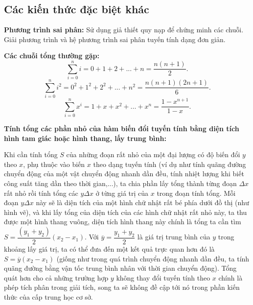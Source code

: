 \documentclass{article}
\begin{document}
\begin{multicols}{2}
\subsection{Các kiến thức đặc biệt khác}

\noindent \textbf{Phương trình sai phân:} Sử dụng giả thiết quy nạp để chứng minh các chuỗi. Giải phương trình và hệ phương trình sai phân tuyến tính dạng đơn giản.

\noindent \textbf{Các chuỗi tổng thường gặp:}
$$\sum_{i=0}^n i = 0+1+2+...+n = \dfrac{n(n+1)}{2}.$$
$$\sum_{i=0}^n i^2 = 0^2+1^2+2^2+...+n^2 = \dfrac{n(n+1)(2n+1)}{6}.$$
$$\sum_{i=0}^n x^i = 1+x+x^2+...+x^n = \dfrac{1-x^{n+1}}{1-x}.$$

\noindent \textbf{Tính tổng các phần nhỏ của hàm biến đổi tuyến tính bằng diện tích hình tam giác hoặc hình thang, lấy trung bình:}

Khi cần tính tổng $S$ của những đoạn rất nhỏ của một đại lượng có độ biến đổi $y$ theo $x$, phụ thuộc vào biến $x$ theo dạng tuyến tính (ví dụ như tính quãng đường chuyển động của một vật chuyển động nhanh dần đều, tính nhiệt lượng khi biết công suất tăng dần theo thời gian,...), ta chia phần lấy tổng thành từng đoạn $\Delta x$ rất nhỏ rồi tính tổng các $y \Delta x$ ở từng giá trị của $x$ trong đoạn tính tổng. Mỗi đoạn $y \Delta x$ này sẽ là diện tích của một hình chữ nhật rất bé phía dưới đồ thị (như hình vẽ), và khi lấy tổng của diện tích của các hình chữ nhật rất nhỏ này, ta thu được một hình thang vuông, diện tích hình thang này chính là tổng ta cần tìm $S= \dfrac{(y_1+y_2)}{2}(x_2-x_1)$. Với $\overline{y}=\dfrac{y_1+y_2}{2}$ là giá trị trung bình của $y$ trong khoảng lấy giá trị, ta có thể đưa đến một kết quả trực quan hơn đó là $S=\overline{y}(x_2-x_1)$ (giống như trong quá trình chuyển động nhanh dần đều, ta tính quãng đường bằng vận tốc trung bình nhân với thời gian chuyển động). Tổng quát hơn cho cả những trường hợp $y$ không thay đổi tuyến tính theo $x$ chính là phép tích phân trong giải tích, song ta sẽ không đề cập tới nó trong phần kiến thức của cấp trung học cơ sở.



\end{multicols}
\end{document}

